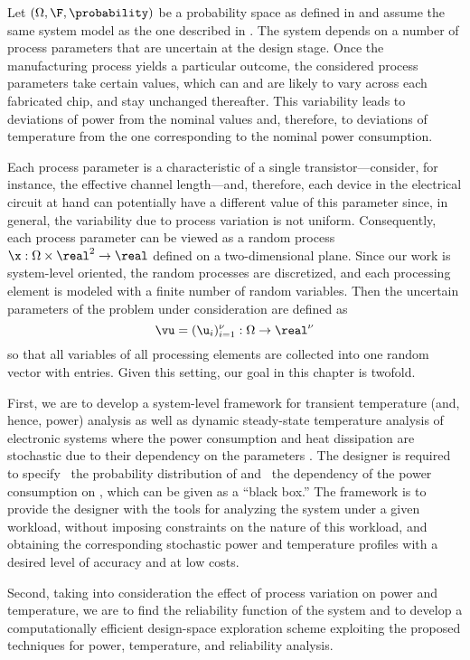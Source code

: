 Let $(\Omega, \F, \probability)$ be a probability space as defined in
 and assume the same system model as the one described
in . The system depends on a number of process parameters
that are uncertain at the design stage. Once the manufacturing process yields a
particular outcome, the considered process parameters take certain values, which
can and are likely to vary across each fabricated chip, and stay unchanged
thereafter. This variability leads to deviations of power from the nominal
values and, therefore, to deviations of temperature from the one corresponding
to the nominal power consumption.

Each process parameter is a characteristic of a single transistor---consider,
for instance, the effective channel length---and, therefore, each device in the
electrical circuit at hand can potentially have a different value of this
parameter since, in general, the variability due to process variation is not
uniform. Consequently, each process parameter can be viewed as a random process
$\x: \Omega \times \real^2 \to \real$ defined on a two-dimensional plane. Since
our work is system-level oriented, the random processes are discretized, and
each processing element is modeled with a finite number of random variables.
Then the uncertain parameters of the problem under consideration are defined as
\[
  \vu = (\u_i)_{i = 1}^\nu: \Omega \to \real^\nu
\]
so that all variables of all processing elements are collected into one random
vector with \nu entries. Given this setting, our goal in this chapter is
twofold.

First, we are to develop a system-level framework for transient temperature
(and, hence, power) analysis as well as dynamic steady-state temperature
analysis of electronic systems where the power consumption and heat dissipation
are stochastic due to their dependency on the parameters \vu. The designer is
required to specify \one~the probability distribution of \vu and \two~the
dependency of the power consumption on \vu, which can be given as a ``black
box.'' The framework is to provide the designer with the tools for analyzing the
system under a given workload, without imposing constraints on the nature of
this workload, and obtaining the corresponding stochastic power \mp and
temperature \mq profiles with a desired level of accuracy and at low costs.

Second, taking into consideration the effect of process variation on power and
temperature, we are to find the reliability function of the system and to
develop a computationally efficient design-space exploration scheme exploiting
the proposed techniques for power, temperature, and reliability analysis.
